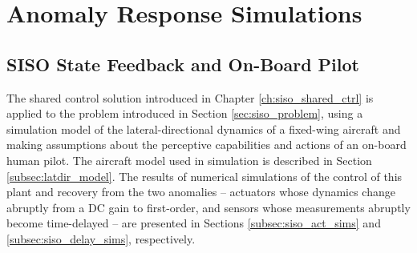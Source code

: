 \chapter{Anomaly Response Simulations}  \label{ch:numerical}
\section{SISO State Feedback and On-Board Pilot}

The shared control solution introduced in Chapter \ref{ch:siso_shared_ctrl} is applied to the problem introduced in Section \ref{sec:siso_problem}, using a simulation model of the lateral-directional dynamics of a fixed-wing aircraft and making assumptions about the perceptive capabilities and actions of an on-board human pilot. The aircraft model used in simulation is described in Section \ref{subsec:latdir_model}. The results of numerical simulations of the control of this plant and recovery from the two anomalies -- actuators whose dynamics change abruptly from a DC gain to first-order, and sensors whose measurements abruptly become time-delayed -- are presented in Sections \ref{subsec:siso_act_sims} and \ref{subsec:siso_delay_sims}, respectively.

